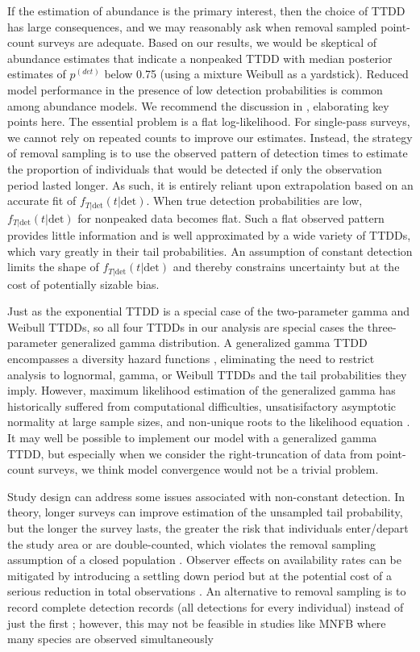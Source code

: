 \documentclass[12pt]{article}
\newcommand{\pdet}{p^{(det)}}
\newcommand{\dt}{\text{det}}
\newcommand{\ftdt}{f_{T|\dt}(t|\dt)}
\begin{document}
If the estimation of abundance is the primary interest, then the choice of TTDD has large consequences, and we may reasonably ask when removal sampled point-count surveys are adequate.
Based on our results, we would be skeptical of abundance estimates that indicate a nonpeaked TTDD with median posterior estimates of $\pdet$ below 0.75 (using a mixture Weibull as a yardstick).
Reduced model performance in the presence of low detection probabilities is common among abundance models.
We recommend the discussion in \citet{CoullAgresti1999}, elaborating key points here.
The essential problem is a flat log-likelihood.
For single-pass surveys, we cannot rely on repeated counts to improve our estimates.
Instead, the strategy of removal sampling is to use the observed pattern of detection times to estimate the proportion of individuals that would be detected if only the observation period lasted longer.  
As such, it is entirely reliant upon extrapolation based on an accurate fit of $\ftdt$.
When true detection probabilities are low, $\ftdt$ for nonpeaked data becomes flat.
Such a flat observed pattern provides little information and is well approximated by a wide variety of TTDDs, which vary greatly in their tail probabilities.
An assumption of constant detection limits the shape of $\ftdt$ and thereby constrains uncertainty but at the cost of potentially sizable bias.

Just as the exponential TTDD is a special case of the two-parameter gamma and Weibull TTDDs, so all four TTDDs in our analysis are special cases the three-parameter generalized gamma distribution.
A generalized gamma TTDD encompasses a diversity hazard functions \citep{Cox2007}, eliminating the need to restrict analysis to lognormal, gamma, or Weibull TTDDs and the tail probabilities they imply.
However, maximum likelihood estimation of the generalized gamma has historically suffered from computational difficulties, unsatisifactory asymptotic normality at large sample sizes, and non-unique roots to the likelihood equation \citep{CoorayAnand2008, NoufailyJones2013}.
It may well be possible to implement our model with a generalized gamma TTDD, but especially when we consider the right-truncation of data from point-count surveys, we think model convergence would not be a trivial problem.

Study design can address some issues associated with non-constant detection.
In theory, longer surveys can improve estimation of the unsampled tail probability, but the longer the survey lasts, the greater the risk that individuals enter/depart the study area or are double-counted, which violates the removal sampling assumption of a closed population \citep{LeeMarsden2008, Reidy2011}.  
Observer effects on availability rates can be mitigated by introducing a settling down period but at the potential cost of a serious reduction in total observations \citep{LeeMarsden2008}.
An alternative to removal sampling is to record complete detection records (all detections for every individual) instead of just the first \citep{Alldredge2007}; however, this may not be feasible in studies like MNFB where many species are observed simultaneously
\end{document}
